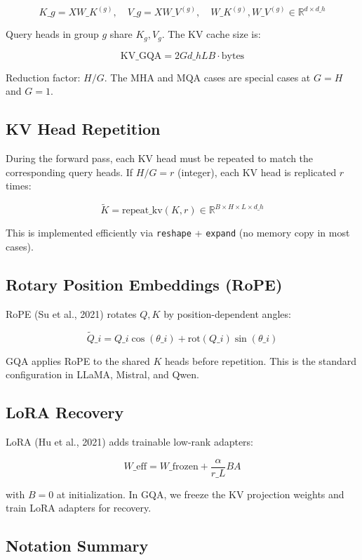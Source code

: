 \[
K\_g = X W\_K^{(g)}, \quad V\_g = X W\_V^{(g)}, \quad W\_K^{(g)}, W\_V^{(g)} \in \mathbb{R}^{d \times d\_h}
\tag{3.6}
\]

Query heads in group $g$ share $K_g, V_g$. The KV cache size is:

\[
\text{KV}\_\text{GQA} = 2 G d\_h L B \cdot \text{bytes}
\tag{3.7}
\]

Reduction factor: $H / G$. The MHA and MQA cases are special cases at 
$G = H$ and $G = 1$.

\subsection{KV Head Repetition}

During the forward pass, each KV head must be repeated to match the 
corresponding query heads. If $H / G = r$ (integer), each KV head is 
replicated $r$ times:

\[
\tilde{K} = \text{repeat\_kv}(K, r) \in \mathbb{R}^{B \times H \times L \times d\_h}
\tag{3.8}
\]

This is implemented efficiently via \texttt{reshape} + \texttt{expand} (no memory copy 
in most cases).

\subsection{Rotary Position Embeddings (RoPE)}

RoPE (Su et al., 2021) rotates $Q, K$ by position-dependent angles:

\[
\tilde{Q}\_i = Q\_i \cos(\theta\_i) + \text{rot}(Q\_i) \sin(\theta\_i)
\tag{3.9}
\]

GQA applies RoPE to the shared $K$ heads before repetition. This is the 
standard configuration in LLaMA, Mistral, and Qwen.

\subsection{LoRA Recovery}

LoRA (Hu et al., 2021) adds trainable low-rank adapters:

\[
W\_\text{eff} = W\_\text{frozen} + \frac{\alpha}{r\_L} B A
\tag{3.10}
\]

with $B = 0$ at initialization. In GQA, we freeze the KV projection weights 
and train LoRA adapters for recovery.

\subsection{Notation Summary}
